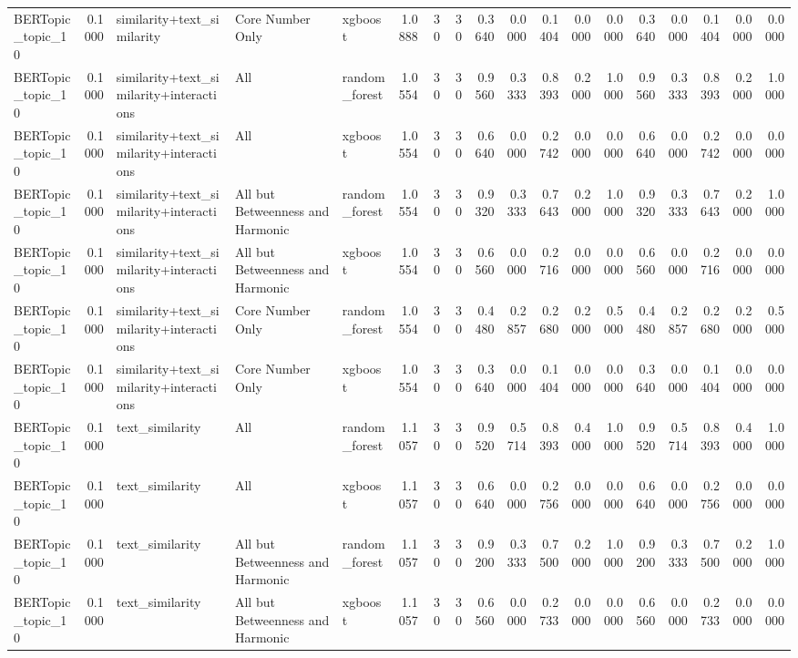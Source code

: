 \begin{tabular}{lrlllrrrrrrrrrrrrr}
BERTopic_topic_10 & 0.1000 & similarity+text_similarity & Core Number Only & xgboost & 1.0888 & 30 & 30 & 0.3640 & 0.0000 & 0.1404 & 0.0000 & 0.0000 & 0.3640 & 0.0000 & 0.1404 & 0.0000 & 0.0000 \\
BERTopic_topic_10 & 0.1000 & similarity+text_similarity+interactions & All & random_forest & 1.0554 & 30 & 30 & 0.9560 & 0.3333 & 0.8393 & 0.2000 & 1.0000 & 0.9560 & 0.3333 & 0.8393 & 0.2000 & 1.0000 \\
BERTopic_topic_10 & 0.1000 & similarity+text_similarity+interactions & All & xgboost & 1.0554 & 30 & 30 & 0.6640 & 0.0000 & 0.2742 & 0.0000 & 0.0000 & 0.6640 & 0.0000 & 0.2742 & 0.0000 & 0.0000 \\
BERTopic_topic_10 & 0.1000 & similarity+text_similarity+interactions & All but Betweenness and Harmonic & random_forest & 1.0554 & 30 & 30 & 0.9320 & 0.3333 & 0.7643 & 0.2000 & 1.0000 & 0.9320 & 0.3333 & 0.7643 & 0.2000 & 1.0000 \\
BERTopic_topic_10 & 0.1000 & similarity+text_similarity+interactions & All but Betweenness and Harmonic & xgboost & 1.0554 & 30 & 30 & 0.6560 & 0.0000 & 0.2716 & 0.0000 & 0.0000 & 0.6560 & 0.0000 & 0.2716 & 0.0000 & 0.0000 \\
BERTopic_topic_10 & 0.1000 & similarity+text_similarity+interactions & Core Number Only & random_forest & 1.0554 & 30 & 30 & 0.4480 & 0.2857 & 0.2680 & 0.2000 & 0.5000 & 0.4480 & 0.2857 & 0.2680 & 0.2000 & 0.5000 \\
BERTopic_topic_10 & 0.1000 & similarity+text_similarity+interactions & Core Number Only & xgboost & 1.0554 & 30 & 30 & 0.3640 & 0.0000 & 0.1404 & 0.0000 & 0.0000 & 0.3640 & 0.0000 & 0.1404 & 0.0000 & 0.0000 \\
BERTopic_topic_10 & 0.1000 & text_similarity & All & random_forest & 1.1057 & 30 & 30 & 0.9520 & 0.5714 & 0.8393 & 0.4000 & 1.0000 & 0.9520 & 0.5714 & 0.8393 & 0.4000 & 1.0000 \\
BERTopic_topic_10 & 0.1000 & text_similarity & All & xgboost & 1.1057 & 30 & 30 & 0.6640 & 0.0000 & 0.2756 & 0.0000 & 0.0000 & 0.6640 & 0.0000 & 0.2756 & 0.0000 & 0.0000 \\
BERTopic_topic_10 & 0.1000 & text_similarity & All but Betweenness and Harmonic & random_forest & 1.1057 & 30 & 30 & 0.9200 & 0.3333 & 0.7500 & 0.2000 & 1.0000 & 0.9200 & 0.3333 & 0.7500 & 0.2000 & 1.0000 \\
BERTopic_topic_10 & 0.1000 & text_similarity & All but Betweenness and Harmonic & xgboost & 1.1057 & 30 & 30 & 0.6560 & 0.0000 & 0.2733 & 0.0000 & 0.0000 & 0.6560 & 0.0000 & 0.2733 & 0.0000 & 0.0000 \\

\end{tabular}
